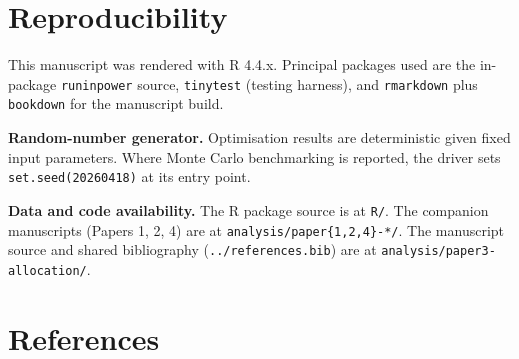 \documentclass[
  11pt,
]{article}
\begin{document}
\section{Reproducibility}\label{reproducibility}

This manuscript was rendered with R 4.4.x. Principal packages used are
the in-package \texttt{runinpower} source, \texttt{tinytest} (testing
harness), and \texttt{rmarkdown} plus \texttt{bookdown} for the
manuscript build.

\textbf{Random-number generator.} Optimisation results are deterministic
given fixed input parameters. Where Monte Carlo benchmarking is
reported, the driver sets \texttt{set.seed(20260418)} at its entry
point.

\textbf{Data and code availability.} The R package source is at
\texttt{R/}. The companion manuscripts (Papers 1, 2, 4) are at
\texttt{analysis/paper\{1,2,4\}-*/}. The manuscript source and shared
bibliography (\texttt{../references.bib}) are at
\texttt{analysis/paper3-allocation/}.

\section{References}\label{references}
\end{document}
